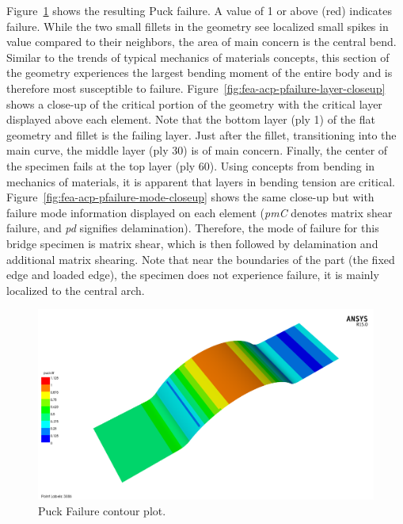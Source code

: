 \clearpage


Figure~\ref{fig:fea-acp-pfailure-notext} shows the resulting Puck failure. A value of 1 or above (red) indicates failure. While the two small fillets in the geometry see localized small spikes in value compared to their neighbors, the area of main concern is the central bend. Similar to the trends of typical mechanics of materials concepts, this section of the geometry experiences the largest bending moment of the entire body and is therefore most susceptible to failure. Figure~\ref{fig:fea-acp-pfailure-layer-closeup} shows a close-up of the critical portion of the geometry with the critical layer displayed above each element. Note that the bottom layer (ply 1) of the flat geometry and fillet is the failing layer. Just after the fillet, transitioning into the main curve, the middle layer (ply 30) is of main concern. Finally, the center of the specimen fails at the top layer (ply 60). Using concepts from bending in mechanics of materials, it is apparent that layers in bending tension are critical. Figure~\ref{fig:fea-acp-pfailure-mode-closeup} shows the same close-up but with failure mode information displayed on each element (\emph{pmC} denotes matrix shear failure, and \emph{pd} signifies delamination). Therefore, the mode of failure for this bridge specimen is matrix shear, which is then followed by delamination and additional matrix shearing. Note that near the boundaries of the part (the fixed edge and loaded edge), the specimen does not experience failure, it is mainly localized to the central arch.

\begin{figure}[htp]
\centering
\includegraphics[width=1\textwidth]{./figures/fea/fea-acp-pfailure-notext}
\caption{Puck Failure contour plot.}
\label{fig:fea-acp-pfailure-notext}
\end{figure}

